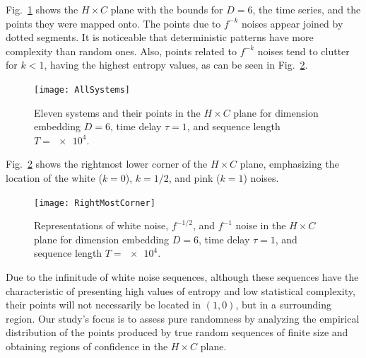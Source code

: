 Fig.~\ref{fig:AllSystems} shows the $H\times C$ plane with the bounds for $D=6$, the time series, and the points they were mapped onto.
The points due to $f^{-k}$ noises appear joined by dotted segments.
It is noticeable that deterministic patterns have more complexity than random ones.
Also, points related to $f^{-k}$ noises tend to clutter for $k<1$, having the highest entropy values, as can be seen in Fig.~\ref{fig:RightMostCorner}.

\begin{figure}[hbt]
	\centering
	\texttt{[image: AllSystems]}
	\caption{Eleven systems and their points in the $H\times C$ plane for dimension embedding $D = 6$, time delay $\tau = 1$, and sequence length $T = \num[scientific-notation=true]{e4}$.}
	\label{fig:AllSystems}
\end{figure}

Fig.~\ref{fig:RightMostCorner} shows the rightmost lower corner of the $H\times C$ plane, emphasizing the location of the white ($k=0$), $k=1/2$, and pink ($k=1$) noises.

\begin{figure}[hbt]
	\centering
	\texttt{[image: RightMostCorner]}
	\caption{Representations of white noise, $f^{-1/2}$, and $f^{-1}$ noise in the $H \times C$ plane  for dimension embedding $D = 6$, time delay $\tau = 1$, and sequence length $T = \num[scientific-notation=true]{e4}$.}
	\label{fig:RightMostCorner}
\end{figure}

Due to the infinitude of white noise sequences, although these sequences have the characteristic of presenting high values of entropy and low statistical complexity, their points will not necessarily be located in $(1, 0)$, but in a surrounding region.
Our study's focus is to assess pure randomness by analyzing the empirical distribution of the points produced by true random sequences of finite size and obtaining regions of confidence in the $H \times C$ plane.

